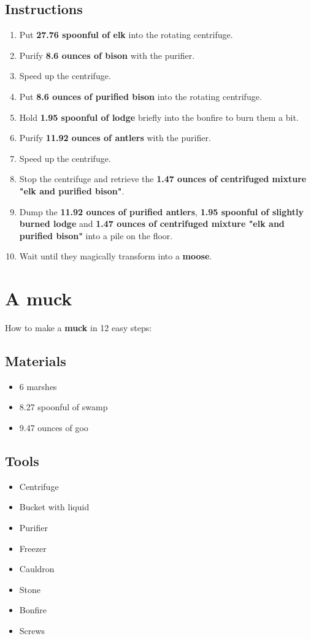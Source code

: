 \documentclass{article}
\begin{document}
\subsection{Instructions}\begin{enumerate}
\item 
Put \textbf{27.76 spoonful of elk} into the rotating centrifuge.
\item 
Purify \textbf{8.6 ounces of bison} with the purifier.
\item 
Speed up the centrifuge.
\item 
Put \textbf{8.6 ounces of purified bison} into the rotating centrifuge.
\item 
Hold \textbf{1.95 spoonful of lodge} briefly into the bonfire to burn them a bit.
\item 
Purify \textbf{11.92 ounces of antlers} with the purifier.
\item 
Speed up the centrifuge.
\item 
Stop the centrifuge and retrieve the \textbf{1.47 ounces of centrifuged mixture "elk and purified bison"}.
\item 
Dump the \textbf{11.92 ounces of purified antlers}, \textbf{1.95 spoonful of slightly burned lodge} and \textbf{1.47 ounces of centrifuged mixture "elk and purified bison"} into a pile on the floor.
\item 
Wait until they magically transform into a \textbf{moose}.
\end{enumerate}
\newpage
\section{A muck}How to make a \textbf{muck} in 12 easy steps:

\subsection{Materials}\begin{itemize}
\item 
6 marshes
\item 
8.27 spoonful of swamp
\item 
9.47 ounces of goo
\end{itemize}
\subsection{Tools}\begin{itemize}
\item 
Centrifuge
\item 
Bucket with liquid
\item 
Purifier
\item 
Freezer
\item 
Cauldron
\item 
Stone
\item 
Bonfire
\item 
Screws
\end{itemize}
\end{document}
